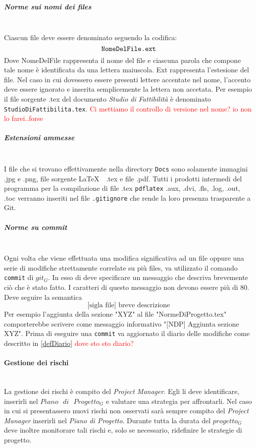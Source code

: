 			\subparagraph{Norme sui nomi dei files} \mbox{} \\
			Ciascun file deve essere denominato seguendo la codifica:
					$$\text{\texttt{NomeDelFile.ext}}$$
			Dove NomeDelFile rappresenta il nome del file e ciascuna parola che compone tale nome è identificata da una lettera maiuscola. Ext rappresenta l'estesione del file. Nel caso in cui dovessero essere presenti lettere accentate nel nome, l'accento deve essere ignorato e inserita semplicemente la lettera non accetata. Per esempio il file sorgente .tex del documento \emph{Studio di Fattibilità} è denominato \texttt{StudioDiFattibilita.tex}. \textcolor{red}{Ci mettiamo il controllo di versione nel nome? io non lo farei..forse}
			
			\subparagraph{Estensioni ammesse}\mbox{} \\
			I file che si trovano effettivamente nella directory \texttt{Docs} sono solamente immagini .jpg e .png, file sorgente \LaTeX $\text{ }$ .tex e file .pdf. Tutti i prodotti intermedi del programma per la compilazione di file .tex \texttt{pdflatex} .aux, .dvi, .fls, .log, .out, .toc verranno inseriti nel file \texttt{.gitignore} che rende la loro presenza trasparente a Git.
			
			\subparagraph{Norme su commit}\mbox{} \\
			Ogni volta che viene effettuata una modifica significativa ad un file oppure una serie di modifiche strettamente correlate su più files, va utilizzato il comando \texttt{commit} di $git_G$. In esso di deve specificare un messaggio che descriva brevemente ciò che è stato fatto. I caratteri di questo messaggio non devono essere più di 80. Deve seguire la semantica
			$$\text{[sigla file] breve descrizione}$$
			Per esempio l'aggiunta della sezione "XYZ" al file "NormeDiProgetto.tex" comporterebbe scrivere come messaggio informativo "[NDP] Aggiunta sezione XYZ". Prima di eseguire una \texttt{commit} va aggiornato il diario delle modifiche come descritto in \ref{defDiario} \textcolor{red}{dove sto sto diario?} 
			
		\paragraph{Gestione dei rischi} \mbox{} \\
		La gestione dei rischi è compito del \emph{Project Manager}. Egli li deve identificare, inserirli nel $Piano\text{ }di\text{ }Progetto_G$ e valutare una strategia per affrontarli. Nel caso in cui si presentassero nuovi rischi non osservati sarà sempre compito del \emph{Project Manager} inserirli nel \emph{Piano di Progetto}. Durante tutta la durata del $progetto_G$ deve inoltre monitorare tali rischi e, solo se necessario, ridefinire le strategie di progetto.
		
